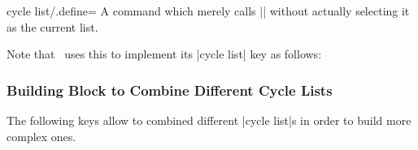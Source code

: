 \begin{pgfplotskey}{cycle list/.define=}
	A command which merely calls |\pgfplotscreateplotcyclelist| without actually selecting it as the current list.

	Note that \PGFPlots\ uses this to implement its |cycle list| key as follows:
\begin{codeexample}
\end{codeexample}
	
\end{pgfplotskey}

\subsubsection{Building Block to Combine Different Cycle Lists}
The following keys allow to combined different |cycle list|s in order to build more complex ones.

